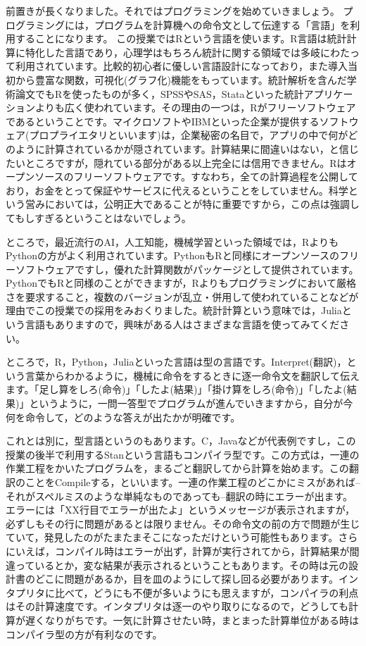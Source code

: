 \documentclass{ltjsbook}
\begin{document}
前置きが長くなりました。それではプログラミングを始めていきましょう。
プログラミングには，プログラムを計算機への命令文として伝達する「言語」を利用することになります。
この授業ではRという言語を使います。R言語は統計計算に特化した言語であり，心理学はもちろん統計に関する領域では多岐にわたって利用されています。比較的初心者に優しい言語設計になっており，また導入当初から豊富な関数，可視化(グラフ化)機能をもっています。統計解析を含んだ学術論文でもRを使ったものが多く，SPSSやSAS，Stataといった統計アプリケーションよりも広く使われています。その理由の一つは，Rがフリーソフトウェアであるということです。マイクロソフトやIBMといった企業が提供するソフトウェア(プロプライエタリといいます)は，企業秘密の名目で，アプリの中で何がどのように計算されているかが隠されています。計算結果に間違いはない，と信じたいところですが，隠れている部分がある以上完全には信用できません。Rはオープンソースのフリーソフトウェアです。すなわち，全ての計算過程を公開しており，お金をとって保証やサービスに代えるということをしていません。科学という営みにおいては，公明正大であることが特に重要ですから，この点は強調してもしすぎるということはないでしょう。

ところで，最近流行のAI，人工知能，機械学習といった領域では，RよりもPythonの方がよく利用されています。PythonもRと同様にオープンソースのフリーソフトウェアですし，優れた計算関数がパッケージとして提供されています。PythonでもRと同様のことができますが，Rよりもプログラミングにおいて厳格さを要求すること，複数のバージョンが乱立・併用して使われていることなどが理由でこの授業での採用をみおくりました。統計計算という意味では，Juliaという言語もありますので，興味がある人はさまざまな言語を使ってみてください。

ところで，R，Python，Juliaといった言語は型の言語です。Interpret(翻訳)，という言葉からわかるように，機械に命令をするときに逐一命令文を翻訳して伝えます。「足し算をしろ(命令)」「したよ(結果)」「掛け算をしろ(命令)」「したよ(結果)」というように，一問一答型でプログラムが進んでいきますから，自分が今何を命令して，どのような答えが出たかが明確です。

これとは別に，型言語というのもあります。C，Javaなどが代表例ですし，この授業の後半で利用するStanという言語もコンパイラ型です。この方式は，一連の作業工程をかいたプログラムを，まるごと翻訳してから計算を始めます。この翻訳のことをCompileする，といいます。一連の作業工程のどこかにミスがあれば--それがスペルミスのような単純なものであっても--翻訳の時にエラーが出ます。エラーには「XX行目でエラーが出たよ」というメッセージが表示されますが，必ずしもその行に問題があるとは限りません。その命令文の前の方で問題が生じていて，発見したのがたまたまそこになっただけという可能性もあります。さらにいえば，コンパイル時はエラーが出ず，計算が実行されてから，計算結果が間違っているとか，変な結果が表示されるということもあります。その時は元の設計書のどこに問題があるか，目を皿のようにして探し回る必要があります。インタプリタに比べて，どうにも不便が多いようにも思えますが，コンパイラの利点はその計算速度です。インタプリタは逐一のやり取りになるので，どうしても計算が遅くなりがちです。一気に計算させたい時，まとまった計算単位がある時はコンパイラ型の方が有利なのです。
\end{document}
